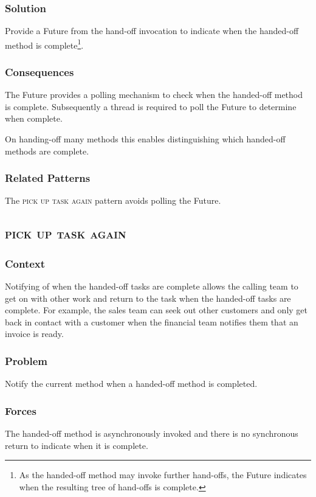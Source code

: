 \documentclass[prodmode]{style/acmlarge}
\begin{document}
\subsubsection*{Solution} Provide a Future from the hand-off invocation to
indicate when the handed-off method is complete\footnote{As the handed-off
method may invoke further hand-offs, the Future indicates when the resulting
tree of hand-offs is complete.}.

\subsubsection*{Consequences} The Future provides a polling mechanism to check
when the handed-off method is complete.  Subsequently a thread is required to
poll the Future to determine when complete.

On handing-off many methods this enables distinguishing which handed-off methods
are complete.

\subsubsection*{Related Patterns} The \textsc{pick up task again} pattern avoids
polling the Future.



\subsection{\textsc{\textbf{pick up task again}}}

\subsubsection*{Context} Notifying of when the handed-off tasks are complete allows
the calling team to get on with other work and return to the task when the
handed-off tasks are complete.  For example, the sales team can seek out other
customers and only get back in contact with a customer when the financial team
notifies them that an invoice is ready.

\subsubsection*{Problem} Notify the current method when a handed-off method is
completed.

\subsubsection*{Forces} The handed-off method is asynchronously invoked and there is
no synchronous return to indicate when it is complete.
\end{document}
